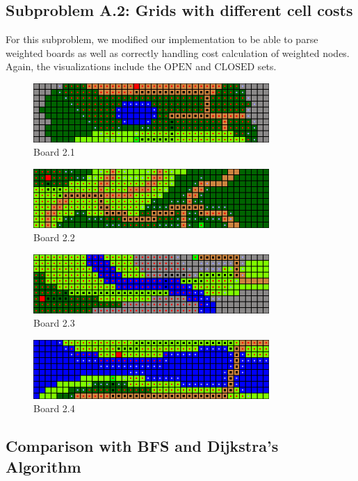 \newpage


\subsection*{Subproblem A.2: Grids with different cell costs}

For this subproblem, we modified our implementation to be able to parse weighted
boards as well as correctly handling cost calculation of weighted nodes.
Again, the visualizations include the $\text{OPEN}$ and $\text{CLOSED}$ sets.

\begin{figure}[h!]
  \centering
    \includegraphics[width=0.8\textwidth]{img/board-2-1-astar}
    \caption{Board 2.1}
\end{figure}

\begin{figure}[h!]
  \centering
    \includegraphics[width=0.8\textwidth]{img/board-2-2-astar}
    \caption{Board 2.2}
\end{figure}

\begin{figure}[h!]
  \centering
    \includegraphics[width=0.8\textwidth]{img/board-2-3-astar}
    \caption{Board 2.3}
\end{figure}

\begin{figure}[h!]
  \centering
    \includegraphics[width=0.8\textwidth]{img/board-2-4-astar}
    \caption{Board 2.4}
\end{figure}

\newpage

\subsection*{Comparison with BFS and Dijkstra's Algorithm}


